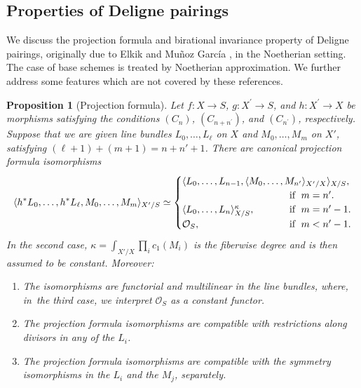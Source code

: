 \documentclass[JEP,XML,SOM,Unicode,published]{cedram}
\theoremstyle{plain}
\newtheorem{proposition}[theorem]{Proposition}
\theoremstyle{definition}
\newcommand{\Ocal}{\mathcal O}
\begin{document}
\subsection{Properties of Deligne pairings}
We discuss the projection formula and birational invariance property of Deligne pairings, originally due to Elkik \cite{Elkikfib} and Muñoz García \cite{Munoz}, in the Noetherian setting. The case of base schemes is treated by Noetherian approximation. We further address some features which are not covered by these references.

\begin{proposition}[Projection formula]\label{prop:projformuladeli}
Let $f\colon X\!\to\! S$, $g\colon X^{\prime}\!\to\! S$, and \hbox{$h\colon X^{\prime}\!\to\! X$} be morphisms satisfying the conditions $(C_{n})$, $(C_{n+n^{\prime}})$, and $(C_{n^{\prime}})$, respectively. Suppose that we are given line bundles $L_0, \ldots, L_\ell$ on $X$ and $M_{0}, \ldots, M_{m}$ on $X'$, satisfying $(\ell+1)+(m+1)=n+n'+1$. There are canonical projection formula isomorphisms
\begin{displaymath}
\langle h^\ast L_0, \ldots, h^\ast L_\ell, M_{0}, \ldots, M_{m} \rangle_{X'/S} \simeq
\begin{cases}
\langle L_0, \ldots, L_{n-1}, \langle M_{0}, \ldots, M_{n'} \rangle_{X'/X} \rangle_{X/S},\\
& \hspace*{-2.5cm}\text{if }\; m = n'.\\
\langle L_0, \ldots, L_{n} \rangle_{X/S}^{\kappa},
& \hspace*{-2.5cm}\text{if }\; m= n'-1.\\
\Ocal_S, & \hspace*{-2.5cm}\text{if }\; m < n'-1.
\end{cases}
\end{displaymath}
In the second case, $\kappa = \int_{X'/X} \prod_{i} c_1(M_i)$ is the fiberwise degree and is then assumed to be constant. Moreover:
\begin{enumerate}
\item The isomorphisms are functorial and multilinear in the line bundles, where, in~the third case, we interpret $\Ocal_S$ as a constant functor.
\item The projection formula isomorphisms are compatible with restrictions along divisors in any of the $L_i$.
\item The projection formula isomorphisms are compatible with the symmetry isomorphisms in the $L_{i}$ and the $M_{j}$, separately.
\end{enumerate}
\end{proposition}
\end{document}
